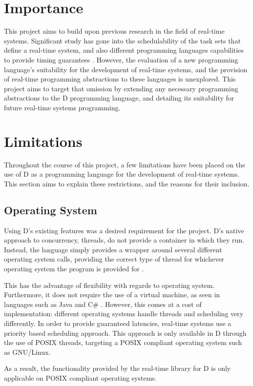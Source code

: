 \section{Importance} %
This project aims to build upon previous research in the field of real-time systems. 
Significant study has gone into the schedulability of the task sets that 
define a real-time system, and also different programming languages capabilities 
to provide timing guarantees \cite{burns-sched-analysis,atc-article}. 
However, the evaluation of a new programming language's suitability for the 
development of real-time systems, and the provision of real-time programming 
abstractions to these languages is unexplored. This project aims to target that 
omission by extending any necessary programming abstractions to the D programming 
language, and detailing its suitability for future real-time systems programming.
\section{Limitations} %
Throughout the course of this project, a few limitations have been placed on the 
use of D as a programming language for the development of real-time systems. 
This section aims to explain these restrictions, and the reasons for
their inclusion.
\subsection{Operating System}
Using D's existing features was a desired requirement for the project. D's native 
approach to concurrency, threads, do not provide a container in which they run. 
Instead, the language simply provides a wrapper around several different operating 
system calls, providing the correct type of thread for whichever operating system 
the program is provided for \cite{github-core-thread}. 
\par\bigskip\noindent
This has the advantage of flexibility with regards to operating system.
Furthermore, it does not require the use of a virtual machine, as seen in languages such as 
Java and C\# \cite{zhang2007exploiting}. However, this comes at a cost of implementation: 
different operating systems handle threads and scheduling very differently. 
In order to provide guaranteed latencies, real-time systems use a priority based 
scheduling approach. This approach is only available in D through the use of 
POSIX threads, targeting a POSIX compliant operating system such as GNU/Linux. 
\par\bigskip\noindent
As a result, the functionality provided by the real-time library for D is only 
applicable on POSIX compliant operating systems.


